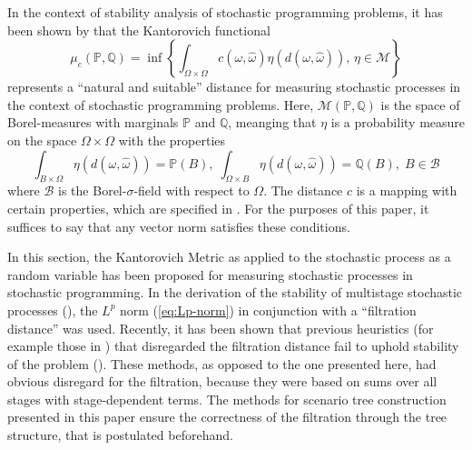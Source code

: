 In the context of stability analysis of stochastic programming problems, it has been shown by \cite{Dupacova2003} that the Kantorovich functional
\begin{equation}
  \label{eq:define-infinitedim-kantorovich}
  \mu_c(\mathbb{P}, \mathbb{Q}) = \inf\left\{\int_{\Omega\times\Omega}c(\omega, \hat{\omega})\eta(d(\omega,\hat{\omega})),\, \eta\in\mathcal{M}\right\}
\end{equation}
represents a  ``natural and suitable''\cite{Dupacova2003} distance for measuring stochastic processes in the context of stochastic programming problems. 
Here, $\mathcal{M}(\mathbb{P, Q})$ is the space of Borel-measures with marginals $\mathbb{P}$ and $\mathbb{Q}$, meanging that $\eta$ is a probability measure on the space $\Omega\times\Omega$ with the properties
\begin{equation}
  \label{eq:define-borel-measures}
  \int_{B\times \Omega} \eta(d(\omega,\hat{\omega})) = \mathbb{P}(B),\;   \int_{\Omega\times B} \eta(d(\omega,\hat{\omega})) = \mathbb{Q}(B),\; B \in \mathcal{B}
\end{equation}
where $\mathcal{B}$ is the Borel-$\sigma$-field with respect to $\Omega$.
The distance $c$ is a mapping with certain properties, which are specified in \cite{Dupacova2003}.
For the purposes of this paper, it suffices to say that any vector norm satisfies these conditions.

\begin{Note}
  In this section, the Kantorovich Metric as applied to the stochastic process as a random variable has been proposed for measuring stochastic processes in stochastic programming.
  In the derivation of the stability of multistage stochastic processes (\cite{Heitsch2010}), the $L^p$ norm (\ref{eq:Lp-norm}) in conjunction with a ``filtration distance'' was used.
  Recently, it has been shown that previous heuristics (for example those in \cite{Dupacova2003}) that disregarded the filtration distance fail to uphold stability of the problem (\cite{Heitsch2009a}).
  These methods, as opposed to the one presented here, had obvious disregard for the filtration, because they were based on sums over all stages with stage-dependent terms.
  The methods for scenario tree construction presented in this paper ensure the correctness of the filtration through the tree structure, that is postulated beforehand.
\end{Note}
